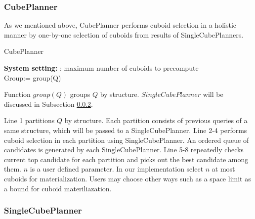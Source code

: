 \subsubsection{CubePlanner}
\label{CubePlanner}

As we mentioned above, CubePlanner performs cuboid selection in a holistic manner by one-by-one selection of cuboids from results of SingleCubePlanners. 

\begin{algorithm}[H]
	\caption{CubePlanner}
	\LinesNumbered 
	\textbf{System setting:} 
	: maximum number of cuboids to precompute\\ 
	Group:= group(Q)\;
	
	
\end{algorithm}
\clearpage

Function $group(Q)$ groups $Q$ by structure. $SingleCubePlanner$ will be discussed in Subsection \ref{SingleCubePlanner}. 

Line 1 partitions $Q$ by structure. Each partition consists of previous queries of a same structure, which will be passed to a SingleCubePlanner. Line 2-4 performs cuboid selection in each partition using SingleCubePlanner. An ordered queue of candidates is generated by each SingleCubePlanner. Line 5-8 repeatedly checks current top candidate for each partition and picks out the best candidate among them. $n$ is a user defined parameter. In our implementation select $n$ at most cuboids for materialization.  Users may choose other ways such as a space limit as a bound for cuboid materiliazation.

\subsubsection{SingleCubePlanner}
\label{SingleCubePlanner}

